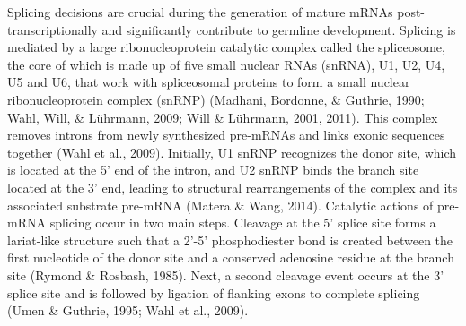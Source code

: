 \documentclass[12pt,twoside]{reedthesis}
\begin{document}
Splicing decisions are crucial during the generation of mature mRNAs
post-transcriptionally and significantly contribute to germline
development. Splicing is mediated by a large ribonucleoprotein catalytic
complex called the spliceosome, the core of which is made up of five
small nuclear RNAs (snRNA), U1, U2, U4, U5 and U6, that work with
spliceosomal proteins to form a small nuclear ribonucleoprotein complex
(snRNP) (Madhani, Bordonne, \& Guthrie, 1990; Wahl, Will, \& Lührmann, 2009; Will \& Lührmann, 2001, 2011). This
complex removes introns from newly synthesized pre-mRNAs and links
exonic sequences together (Wahl et al., 2009). Initially, U1 snRNP recognizes
the donor site, which is located at the 5' end of the intron, and U2
snRNP binds the branch site located at the 3' end, leading to structural
rearrangements of the complex and its associated substrate pre-mRNA
(Matera \& Wang, 2014). Catalytic actions of pre-mRNA splicing occur in two
main steps. Cleavage at the 5' splice site forms a lariat-like structure
such that a 2'-5' phosphodiester bond is created between the first
nucleotide of the donor site and a conserved adenosine residue at the
branch site (Rymond \& Rosbash, 1985). Next, a second cleavage event occurs at
the 3' splice site and is followed by ligation of flanking exons to
complete splicing (Umen \& Guthrie, 1995; Wahl et al., 2009).
\end{document}
